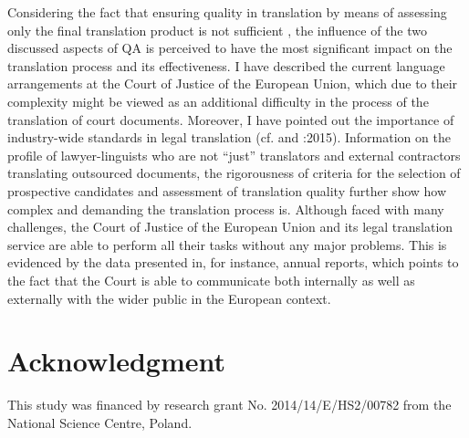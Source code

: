 \documentclass[output=paper]{langsci/langscibook}
\begin{document}
Considering the fact that ensuring quality in translation by means of assessing only the final translation product is not sufficient \citep[279]{Lušicky2017}, the influence of the two discussed aspects of QA is perceived to have the most significant impact on the translation process and its effectiveness. I have described the current language arrangements at the Court of Justice of the European Union, which due to their complexity might be viewed as an additional difficulty in the process of the translation of court documents. Moreover, I have pointed out the importance of industry-wide standards in legal translation (cf. \citeauthor{EN2006} and \citeauthor{ISO2015}:2015). Information on the profile of lawyer-linguists who are not “just” translators and external contractors translating outsourced documents, the rigorousness of criteria for the selection of prospective candidates and assessment of translation quality further show how complex and demanding the translation process is. Although faced with many challenges, the Court of Justice of the European Union and its legal translation service are able to perform all their tasks without any major problems. This is evidenced by the data presented in, for instance, annual reports, which points to the fact that the Court is able to communicate both internally as well as externally with the wider public in the European context.

\section*{Acknowledgment}
This study was financed by research grant No. 2014/14/E/HS2/00782 from the National Science Centre, Poland.

 

\sloppy
\printbibliography[heading=subbibliography,notkeyword=this] 
\end{document}
